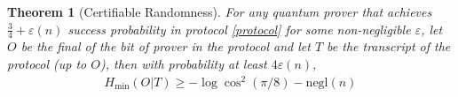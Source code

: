 \documentclass{article}
\newtheorem{thm}{Theorem}
\begin{document}
\begin{thm}[Certifiable Randomness]
For any quantum prover that achieves $\frac{3}{4}+\varepsilon(n)$ success probability in protocol \ref{protocol} for some non-negligible $\varepsilon$, let $O$ be the final of the bit of prover in the protocol and let $T$ be the transcript of the protocol (up to $O$), then with probability at least $4\varepsilon(n)$,
\begin{align}
    H_{\mathrm{min}}(O|T) \geq -\log \cos^{2}(\pi/8) - \mathrm{negl}(n)
\end{align}
\end{thm}


\end{document}
